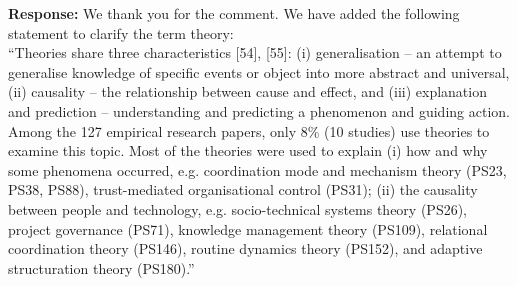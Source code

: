 \documentclass[a4paper,twoside,11pt]{reviewresponse}
\begin{document}
\textbf{Response:}
We thank you for the comment. We have added the following statement to clarify the term theory:\\
``Theories share three characteristics [54], [55]: (i) generalisation -- an attempt to generalise knowledge of specific events or object into more abstract and universal, (ii) causality -- the relationship between cause and effect, and (iii) explanation and prediction -- understanding and predicting a phenomenon and guiding action. Among the 127 empirical research papers, only 8\% (10 studies) use theories to examine this topic. Most of the theories were used to explain (i) how and why some phenomena occurred, e.g. coordination mode and mechanism theory (PS23, PS38, PS88), trust-mediated organisational control (PS31); (ii) the causality between people and technology, e.g. socio-technical systems theory (PS26), project governance (PS71), knowledge management theory (PS109), relational coordination theory (PS146), routine dynamics theory (PS152), and adaptive structuration theory (PS180).''
\end{document}
